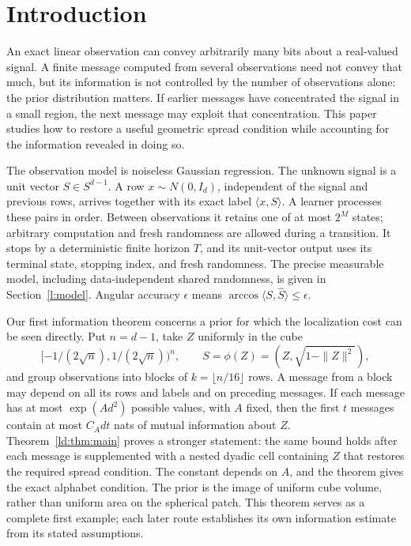 \section{Introduction}\label{l:introduction}

An exact linear observation can convey arbitrarily many bits about a
real-valued signal. A finite message computed from several observations
need not convey that much, but its information is not controlled by
the number of observations alone: the prior distribution matters.
If earlier messages have concentrated the signal in a small region,
the next message may exploit that concentration. This paper studies
how to restore a useful geometric spread condition while accounting
for the information revealed in doing so.

The observation model is noiseless Gaussian regression. The unknown
signal is a unit vector \(S\in S^{d-1}\). A row
\(x\sim N(0,I_d)\), independent of the signal and previous rows,
arrives together with its exact label \(\langle x,S\rangle\).
A learner processes these pairs in order. Between observations it
retains one of at most \(2^M\) states; arbitrary computation and fresh
randomness are allowed during a transition. It stops by a deterministic
finite horizon \(T\), and its unit-vector output uses its terminal
state, stopping index, and fresh randomness. The precise measurable
model, including data-independent shared randomness, is given in
Section~\ref{l:model}. Angular accuracy \(\epsilon\) means
\(\arccos\langle S,\widehat S\rangle\le\epsilon\).

Our first information theorem concerns a prior for which the
localization cost can be seen directly. Put \(n=d-1\), take \(Z\) uniformly
in the cube
\[
 [-1/(2\sqrt n),1/(2\sqrt n))^n,
 \qquad S=\phi(Z)=(Z,\sqrt{1-\|Z\|^2}),
\]
and group observations into blocks of \(k=\lfloor n/16\rfloor\)
rows. A message from a block may depend on all its rows and labels
and on preceding messages. If each message has at most
\(\exp(Ad^2)\) possible values, with \(A\) fixed, then the
first \(t\) messages contain at most \(C_A dt\) nats of mutual
information about \(Z\). Theorem~\ref{ld:thm:main} proves a
stronger statement: the same bound holds after each message is
supplemented with a nested dyadic cell containing \(Z\) that restores
the required spread condition. The constant depends on \(A\), and
the theorem gives the exact alphabet condition. The prior is the
image of uniform cube volume, rather than uniform area on the
spherical patch. This theorem serves as a complete first example; each later
route establishes its own information estimate from its stated
assumptions.

